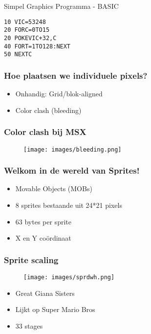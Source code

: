 
\begin{frame}[fragile]{Simpel Graphics Programma - BASIC}

\begin{lstlisting}
10 VIC=53248
20 FORC=0TO15
20 POKEVIC+32,C
40 FORT=1TO128:NEXT
50 NEXTC
\end{lstlisting}

\end{frame}


\begin{frame}
\frametitle{Hoe plaatsen we individuele pixels?}

\begin{itemize}
\item Onhandig: Grid/blok-aligned
\item Color clash (bleeding)
\end{itemize}

\end{frame}


\begin{frame}
\frametitle{Color clash bij MSX}

\begin{figure}
\texttt{[image: images/bleeding.png]}
\end{figure}

\end{frame}


\begin{frame}
\frametitle{Welkom in de wereld van Sprites!}

\begin{itemize}
\item Movable Objects (MOBs)
\item 8 sprites bestaande uit 24*21 pixels
\item 63 bytes per sprite
\item X en Y co\"ordinaat
\end{itemize}

\end{frame}


\begin{frame}
\frametitle{Sprite scaling}

\begin{figure}
\texttt{[image: images/sprdwh.png]}
\end{figure}

\begin{itemize}
\item Great Giana Sisters
\item Lijkt op Super Mario Bros
\item 33 stages
\end{itemize}

\end{frame}

